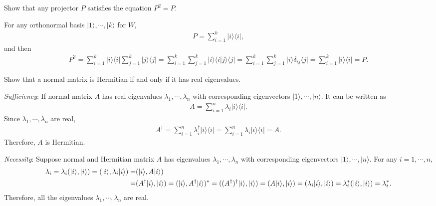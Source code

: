 \documentclass[en]{sol-man}
\begin{document}
\begin{exe}
    Show that any projector $P$ satisfies the equation $P^2=P$.
\end{exe}
\begin{pf}
    For any orthonormal basis $\lvert 1\rangle,\cdots,\lvert k\rangle$ for $W$,
    \begin{align}
        P=\sum_{i=1}^k\lvert i\rangle\langle i\rvert,
    \end{align}
    and then
    \begin{align}
        P^2=\sum_{i=1}^k\lvert i\rangle\langle i\rvert\sum_{j=1}^k\lvert j\rangle\langle j\rvert=\sum_{i=1}^k\sum_{j=1}^k\lvert i\rangle\langle i\vert j\rangle\langle j\rvert=\sum_{i=1}^k\sum_{j=1}^k\lvert i\rangle\delta_{ij}\langle j\rvert=\sum_{i=1}^k\lvert i\rangle\langle i\rvert=P.
    \end{align}
\end{pf}

\begin{exe}
    Show that a normal matrix is Hermitian if and only if it has real eigenvalues.
\end{exe}
\begin{pf}
    \emph{Sufficiency}: If normal matrix $A$ has real eigenvalues $\lambda_1,\cdots,\lambda_n$ with corresponding eigenvectors $\lvert 1\rangle,\cdots,\lvert n\rangle$. It can be written as
    \begin{align}
        A=\sum_{i=1}^n\lambda_i\lvert i\rangle\langle i\rvert.
    \end{align}
    Since $\lambda_1,\cdots,\lambda_n$ are real,
    \begin{align}
        A^{\dagger}=\sum_{i=1}^n\lambda_i^{\dagger}\lvert i\rangle\langle i\rvert=\sum_{i=1}^n\lambda_i\lvert i\rangle\langle i\rvert=A.
    \end{align}
    Therefore, $A$ is Hermitian.

    \emph{Necessity}: Suppose normal and Hermitian matrix $A$ has eigenvalues $\lambda_1,\cdots,\lambda_n$ with corresponding eigenvectors $\lvert 1\rangle,\cdots,\lvert n\rangle$. For any $i=1,\cdots,n$,
    \begin{align}
        \notag\lambda_i=\lambda_i(\lvert i\rangle,\lvert i\rangle)=(\lvert i\rangle,\lambda_i\lvert i\rangle)=&(\lvert i\rangle,A\lvert i\rangle)\\
        =&(A^{\dagger}\lvert i\rangle,\lvert i\rangle)=(\lvert i\rangle,A^{\dagger}\lvert i\rangle)^*=((A^{\dagger})^{\dagger}\lvert i\rangle,\lvert i\rangle)=(A\lvert i\rangle,\lvert i\rangle)=(\lambda_i\lvert i\rangle,\lvert i\rangle)=\lambda_i^*(\lvert i\rangle,\lvert i\rangle)=\lambda_i^*.
    \end{align}
    Therefore, all the eigenvalues $\lambda_1,\cdots,\lambda_n$ are real.
\end{pf}
\end{document}
